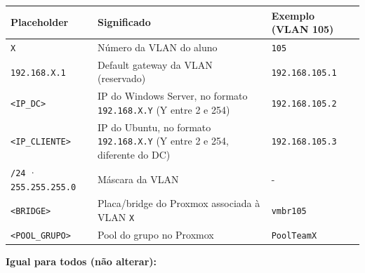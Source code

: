 \documentclass[11pt,a4paper,oneside]{report}
\begin{document}
\begin{center}\small
\begin{tabularx}{\linewidth}{|>{\raggedright\arraybackslash}X|>{\raggedright\arraybackslash}X|>{\raggedright\arraybackslash}X|}
\hline
\rowcolor{azul!10}\textbf{Placeholder} & \textbf{Significado} & \textbf{Exemplo (VLAN 105)} \\
\hline
\texttt{X} & Número da VLAN do aluno & \texttt{105} \\
\hline
\texttt{192.168.X.1} & Default gateway da VLAN (reservado) & \texttt{192.168.105.1} \\
\hline
\texttt{\textless{}IP\_DC\textgreater{}} & IP do Windows Server, no formato \texttt{192.168.X.Y} (Y entre 2 e 254) & \texttt{192.168.105.2} \\
\hline
\texttt{\textless{}IP\_CLIENTE\textgreater{}} & IP do Ubuntu, no formato \texttt{192.168.X.Y} (Y entre 2 e 254, diferente do DC) & \texttt{192.168.105.3} \\
\hline
\texttt{/\allowbreak{}24} · \texttt{255.255.255.0} & Máscara da VLAN & - \\
\hline
\texttt{\textless{}BRIDGE\textgreater{}} & Placa/bridge do Proxmox associada à VLAN \texttt{X} & \texttt{vmbr105} \\
\hline
\texttt{\textless{}POOL\_GRUPO\textgreater{}} & Pool do grupo no Proxmox & \texttt{PoolTeamX} \\
\hline
\end{tabularx}
\end{center}

\textbf{Igual para todos (não alterar):}
\end{document}
